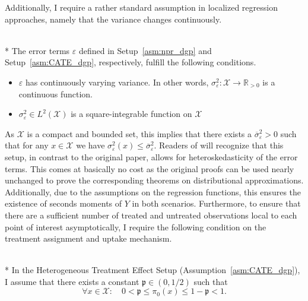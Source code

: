 Additionally, I require a rather standard assumption in localized regression approaches, namely that the variance changes continuously.
\begin{boxD}
	\begin{asm}\label{asm:errors}\mbox{}\\*
		The error terms $\varepsilon$ defined in Setup~\ref{asm:npr_dgp} and Setup~\ref{asm:CATE_dgp}, respectively, fulfill the following conditions.
        \begin{itemize}
            \item $\varepsilon$ has continuously varying variance.
		      In other words, $\sigma^2_{\varepsilon}: \mathcal{X} \rightarrow \mathbb{R}_{>0}$ is a continuous function.
            \item $\sigma^2_{\varepsilon} \in L^{2}\left(\mathcal{X}\right)$ is a square-integrable function on $\mathcal{X}$
        \end{itemize}
	\end{asm}
\end{boxD}
As $\mathcal{X}$ is a compact and bounded set, this implies that there exists a $\overline{\sigma}_{\varepsilon}^2 > 0$ such that for any $x \in \mathcal{X}$ we have $\sigma^{2}_{\varepsilon}\left(x\right) \leq \overline{\sigma}_{\varepsilon}^2$.
Readers of \citet{demirkaya_optimal_2024} will recognize that this setup, in contrast to the original paper, allows for heteroskedasticity of the error terms.
This comes at basically no cost as the original proofs can be used nearly unchanged to prove the corresponding theorems on distributional approximations.
Additionally, due to the assumptions on the regression functions, this ensures the existence of seconds moments of $Y$ in both scenarios.
Furthermore, to ensure that there are a sufficient number of treated and untreated observations local to each point of interest asymptotically, I require the following condition on the treatment assignment and uptake mechanism.
\begin{boxD}
	\begin{asm}\label{asm:treatment_overlap}\mbox{}\\*
		In the Heterogeneous Treatment Effect Setup (Assumption~\ref{asm:CATE_dgp}), I assume that there exists a constant $\mathfrak{p} \in (0, 1/2)$ such that
		\begin{equation}
			\forall x \in \mathcal{X}: \quad 
			0 < \mathfrak{p} \leq \pi_{0}\left(x\right) \leq 1 - \mathfrak{p} < 1.
		\end{equation}
	\end{asm}
\end{boxD}
